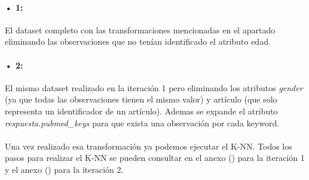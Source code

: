 \paragraph{• 1: } El dataset completo con las transformaciones mencionadas en el apartado  eliminando las observaciones que no tenían identificado el atributo edad.

\paragraph{• 2: } El mismo dataset realizado en la iteración 1 pero eliminando los atributos \textit{gender} (ya que todas las observaciones tienen el mismo valor) y artículo (que solo representa un identificador de un artículo). Ademas se expande el atributo \textit{respuesta.pubmed\_keys} para que exista una observación por cada keyword.

\paragraph{}
Una vez realizado esa transformación ya podemos ejecutar el K-NN. Todos los pasos para realizar el K-NN se pueden consultar en el anexo () para la iteración 1 y el anexo () para la iteración 2.